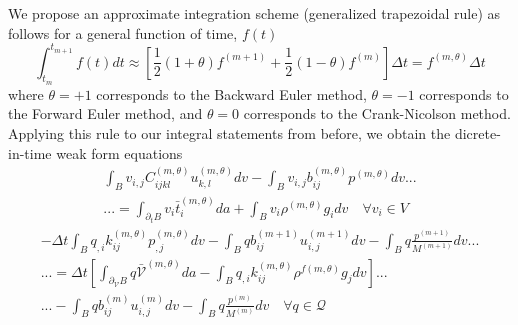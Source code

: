\documentclass[11pt]{article} %
\begin{document}
We propose an approximate integration scheme (generalized trapezoidal rule) as follows for a general function of time, $f(t)$
\begin{equation}
	\int_{t_m}^{t_{m+1}} f(t) dt \approx \left[ \frac{1}{2} (1 + \theta) f^{(m+1)} + \frac{1}{2} (1 - \theta) f^{(m)} \right] \Delta t = f^{(m,\theta)} \Delta t
\end{equation}
where $\theta = +1$ corresponds to the Backward Euler method, $\theta = -1$ corresponds to the Forward Euler method, and $\theta = 0$ corresponds to the Crank-Nicolson method. Applying this rule to our integral statements from before, we obtain the dicrete-in-time weak form equations
\begin{eqnarray}
	\int_B v_{i,j} C_{ijkl}^{(m,\theta)} u_{k,l}^{(m,\theta)} dv - \int_B v_{i,j} b_{ij}^{(m,\theta)} p^{(m,\theta)} dv ... \nonumber \\
	... = \int_{\partial_t B} v_i \bar{t}_i^{(m,\theta)} da + \int_B v_i \rho^{(m,\theta)} g_i dv \quad \forall v_i \in V
\end{eqnarray}
\begin{eqnarray}
	- \Delta t \int_B q_{,i} k_{ij}^{(m,\theta)} p_{,j}^{(m,\theta)} dv - \int_B q b_{ij}^{(m+1)} u_{i,j}^{(m+1)} dv - \int_B q \frac{p^{(m+1)}}{M^{(m+1)}} dv ... \nonumber \\
	... = \Delta t \left[ \int_{\partial_{\mathcal{V}} B} q \bar{\mathcal{V}}^{(m,\theta)} da - \int_B q_{,i} k_{ij}^{(m,\theta)} \rho^{f (m,\theta)} g_j dv \right] ... \nonumber \\
	... - \int_B q b_{ij}^{(m)} u_{i,j}^{(m)} dv - \int_B q \frac{p^{(m)}}{M^{(m)}} dv \quad \forall q \in \mathcal{Q}
\end{eqnarray}
\end{document}
